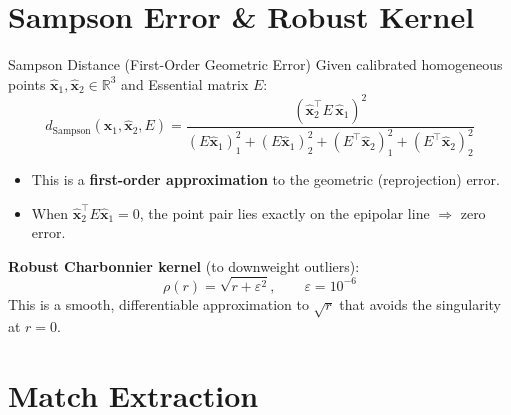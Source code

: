 \documentclass[aspectratio=169, 12pt]{beamer}
\newcommand{\R}{\mathbb{R}}
\begin{document}
\section{Sampson Error \& Robust Kernel}

\begin{frame}{Sampson Distance (First-Order Geometric Error)}
\small
Given calibrated homogeneous points $\hat{\mathbf{x}}_1, \hat{\mathbf{x}}_2 \in \R^3$
and Essential matrix $E$:
\vspace{-0.3em}
\[
    d_{\mathrm{Sampson}}(\hat{\mathbf{x}}_1, \hat{\mathbf{x}}_2, E)
    = \frac{\left(\hat{\mathbf{x}}_2^\top E\, \hat{\mathbf{x}}_1\right)^2}
           {(E\hat{\mathbf{x}}_1)_1^2 + (E\hat{\mathbf{x}}_1)_2^2
          + (E^\top\hat{\mathbf{x}}_2)_1^2 + (E^\top\hat{\mathbf{x}}_2)_2^2}
\]
\vspace{-0.5em}
\begin{itemize}\setlength{\itemsep}{2pt}
    \item This is a \textbf{first-order approximation} to the geometric (reprojection) error.
    \item When $\hat{\mathbf{x}}_2^\top E \hat{\mathbf{x}}_1 = 0$, the point pair
          lies exactly on the epipolar line $\Rightarrow$ zero error.
\end{itemize}

\smallskip
\textbf{Robust Charbonnier kernel} (to downweight outliers):
\vspace{-0.3em}
\[
    \rho(r) = \sqrt{r + \varepsilon^2}, \qquad \varepsilon = 10^{-6}
\]
\vspace{-0.5em}
This is a smooth, differentiable approximation to $\sqrt{r}$ that avoids the
singularity at $r=0$.
\end{frame}

\section{Match Extraction}
\end{document}
